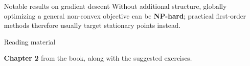 \documentclass[12pt,aspectratio=169]{beamer}
\begin{document}
\begin{frame}{Notable results on gradient descent}
	\vspace{-0.1cm}
	\footnotesize
	Without additional structure, globally optimizing a general non-convex
	objective can be \textbf{NP-hard}; practical first-order methods therefore
	usually target stationary points instead.

\end{frame}

\begin{frame}{Reading material}

	\textbf{Chapter 2} from the book, along with the suggested exercises.

\end{frame}
\end{document}
